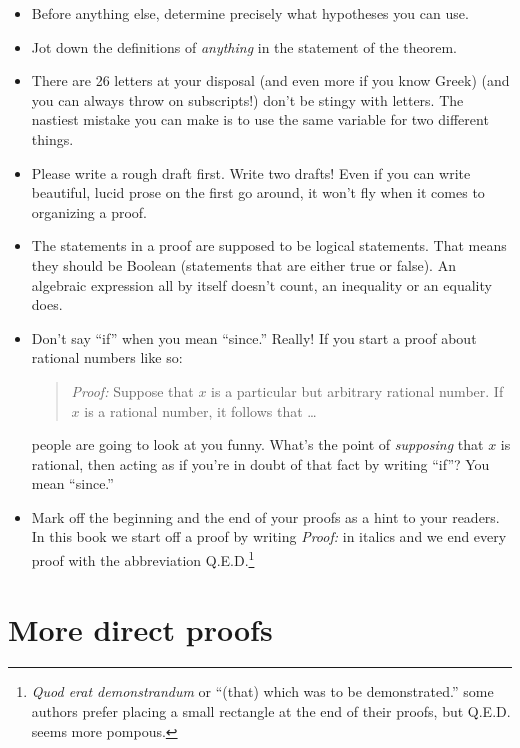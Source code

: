 \begin{itemize}
\item Before anything else, determine precisely what hypotheses you
can use.
\item Jot down the definitions of {\em anything} in the statement of 
the theorem.
\item There are 26 letters at your disposal (and even more if you know
Greek) (and you can always throw on subscripts!) don't be stingy with
letters.  The nastiest mistake you can make is to use the same variable
for two different things.
\item Please write a rough draft first.  Write two drafts!  Even if you
can write beautiful, lucid prose on the first go around, it won't fly
when it comes to organizing a proof.
\item The statements in a proof are supposed to be logical statements.
That means they should be Boolean (statements that are either true or false).
An algebraic expression all by itself doesn't count, an inequality or an 
equality does.  
\item Don't say ``if'' when you mean ``since.''  Really!  If you start a
proof about rational numbers like so:

\begin{quote}
{\em Proof:} Suppose that $x$ is a particular but arbitrary rational number.
If $x$ is a rational number, it follows that \ldots
\end{quote}

\noindent people are going to look at you funny.  What's the point of 
{\em supposing}
that $x$ is rational, then acting as if you're in doubt of that fact by
writing ``if''?   You mean ``since.''
\item Mark off the beginning and the end of your proofs as a hint to your
readers.  In this book we start off a proof by writing {\em Proof:} in 
italics and we end every proof with the abbreviation 
Q.E.D.\footnote{{\em Quod erat demonstrandum} or ``(that) which was to 
be demonstrated.'' some authors prefer placing a small rectangle at 
the end of their proofs, but Q.E.D. seems more pompous.}
\end{itemize}

\clearpage




\newpage
\section{More direct proofs}
\label{sec:more}

